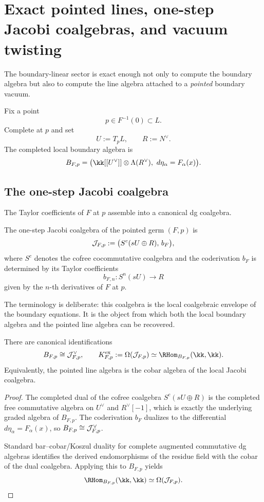\section{Exact pointed lines, one-step Jacobi coalgebras, and vacuum twisting}\label{sec:exact-lines}

The boundary-linear sector is exact enough not only to compute the boundary algebra but also to compute the line algebra attached to a \emph{pointed} boundary vacuum.

Fix a point
\[
p\in F^{-1}(0)\subset L.
\]
Complete at $p$ and set
\[
U:=T_pL,
\qquad
R:=N^\vee.
\]
The completed local boundary algebra is
\[
B_{F,p}
=
\bigl(\kk[[U^\vee]]\ot \Lambda(R^\vee),\ d\eta_\alpha=F_\alpha(x)\bigr).
\]

\subsection{The one-step Jacobi coalgebra}

The Taylor coefficients of $F$ at $p$ assemble into a canonical dg coalgebra.

\begin{definition}
The one-step Jacobi coalgebra of the pointed germ $(F,p)$ is
\[
\mathcal J_{F,p}:=\bigl(S^c(sU\oplus R),\, b_F\bigr),
\]
where $S^c$ denotes the cofree cocommutative coalgebra and the coderivation $b_F$ is determined by its Taylor coefficients
\[
b_{F,n}: S^n(sU)\longrightarrow R
\]
given by the $n$-th derivatives of $F$ at $p$.
\end{definition}

The terminology is deliberate: this coalgebra is the local coalgebraic envelope of the boundary equations. It is the object from which both the local boundary algebra and the pointed line algebra can be recovered.

\begin{theorem}\label{thm:exact-line}
There are canonical identifications
\[
B_{F,p}\cong \cJ_{F,p}^\vee,
\qquad
K^{\mathrm{ex}}_{F,p}:=\Cobar(\cJ_{F,p})
\simeq
\RHom_{B_{F,p}}(\kk,\kk).
\]
Equivalently, the pointed line algebra is the cobar algebra of the local Jacobi coalgebra.
\end{theorem}

\begin{proof}
The completed dual of the cofree coalgebra $S^c(sU\oplus R)$ is the completed free commutative algebra on $U^\vee$ and $R^\vee[-1]$, which is exactly the underlying graded algebra of $B_{F,p}$. The coderivation $b_F$ dualizes to the differential $d\eta_\alpha=F_\alpha(x)$, so $B_{F,p}\cong \mathcal J_{F,p}^\vee$.

Standard bar--cobar/Koszul duality for complete augmented commutative dg algebras identifies the derived endomorphisms of the residue field with the cobar of the dual coalgebra. Applying this to $B_{F,p}$ yields
\[
\RHom_{B_{F,p}}(\kk,\kk)\simeq \Cobar(\cJ_{F,p}).
\]
\end{proof}

